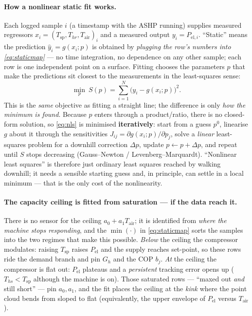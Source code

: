 \documentclass[11pt,a4paper]{article}
\newcommand{\Ths}{T_{hs}}          %
\newcommand{\Thr}{T_{hr}}          %
\newcommand{\Tsp}{T_{\mathrm{sp}}} %
\newcommand{\Tair}{T_{\mathrm{air}}}
\newcommand{\Pel}{P_{\mathrm{el}}}
\begin{document}
\paragraph{How a nonlinear static fit works.}
Each logged sample $i$ (a timestamp with the ASHP running) supplies measured
regressors $x_i=(\Tsp,\Thr,\Tair)_i$ and a measured output $y_i=P_{\mathrm{el},i}$. ``Static''
means the prediction $\hat y_i=g(x_i;p)$ is obtained by \emph{plugging the row's
numbers into \eqref{eq:staticmap}} --- no time integration, no dependence on any
other sample; each row is one independent point on a surface. Fitting chooses the
parameters $p$ that make the predictions sit closest to the measurements in the
least-squares sense:
\begin{equation}
  \min_{p}\ S(p) = \sum_{i=1}^{N}\big(y_i-g(x_i;p)\big)^2 .
  \label{eq:nls}
\end{equation}
This is the \emph{same} objective as fitting a straight line; the difference is only
\emph{how the minimum is found}. Because $p$ enters through a product/ratio, there
is no closed-form solution, so \eqref{eq:nls} is minimised \textbf{iteratively}:
start from a guess $p^{0}$, linearise $g$ about it through the sensitivities
$J_{ij}=\partial g(x_i;p)/\partial p_j$, solve a \emph{linear} least-squares problem
for a downhill correction $\Delta p$, update $p\leftarrow p+\Delta p$, and repeat
until $S$ stops decreasing (Gauss--Newton / Levenberg--Marquardt). ``Nonlinear least
squares'' is therefore just ordinary least squares reached by walking downhill; it
needs a sensible starting guess and, in principle, can settle in a local minimum ---
that is the only cost of the nonlinearity.

\paragraph{The capacity ceiling is fitted from saturation --- if the data reach it.}
There is no sensor for the ceiling $a_0+a_1\Tair$; it is identified from \emph{where
the machine stops responding}, and the $\min(\cdot)$ in \eqref{eq:staticmap} sorts
the samples into the two regimes that make this possible. \emph{Below} the ceiling
the compressor modulates: raising $\Tsp$ raises $\Pel$ and the supply reaches
set-point, so these rows ride the demand branch and pin $G_h$ and the COP $b_j$.
\emph{At} the ceiling the compressor is flat out: $\Pel$ plateaus and a
\emph{persistent} tracking error opens up ($\Ths<\Tsp$ although the machine is on).
Those saturated rows --- ``maxed out \emph{and} still short'' --- pin $a_0,a_1$, and
the fit places the ceiling at the \emph{kink} where the point cloud bends from
sloped to flat (equivalently, the upper envelope of $\Pel$ versus $\Tair$).
\end{document}
